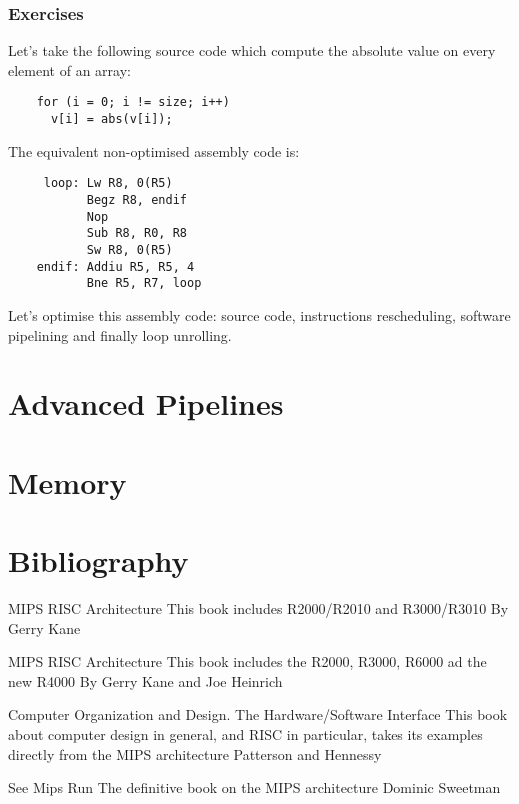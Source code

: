 
\begin{frame}[containsverbatim]
  \frametitle{Exercises}

  Let's take the following source code which compute the absolute value
  on every element of an array:

  \begin{verbatim}
    for (i = 0; i != size; i++)
      v[i] = abs(v[i]);
  \end{verbatim}

  The equivalent non-optimised assembly code is:

  \begin{verbatim}
     loop: Lw R8, 0(R5)
           Begz R8, endif
           Nop
           Sub R8, R0, R8
           Sw R8, 0(R5)
    endif: Addiu R5, R5, 4
           Bne R5, R7, loop
  \end{verbatim}

  Let's optimise this assembly code: source code, instructions rescheduling,
  software pipelining and finally loop unrolling.
\end{frame}

%
%

\section{Advanced Pipelines}


%
%

\section{Memory}

%
%

\section{Bibliography}

\begin{thebibliography}{4}

    MIPS RISC Architecture
    \newblock This book includes R2000/R2010 and R3000/R3010
    \newblock By Gerry Kane

    MIPS RISC Architecture
    \newblock This book includes the R2000, R3000, R6000 ad the new R4000
    \newblock By Gerry Kane and Joe Heinrich

    Computer Organization and Design. The Hardware/Software Interface
    \newblock This book about computer design in general, and RISC
    in particular, takes its examples directly from the MIPS architecture
    \newblock Patterson and Hennessy

    See Mips Run
    \newblock The definitive book on the MIPS architecture
    \newblock Dominic Sweetman

\end{thebibliography}



